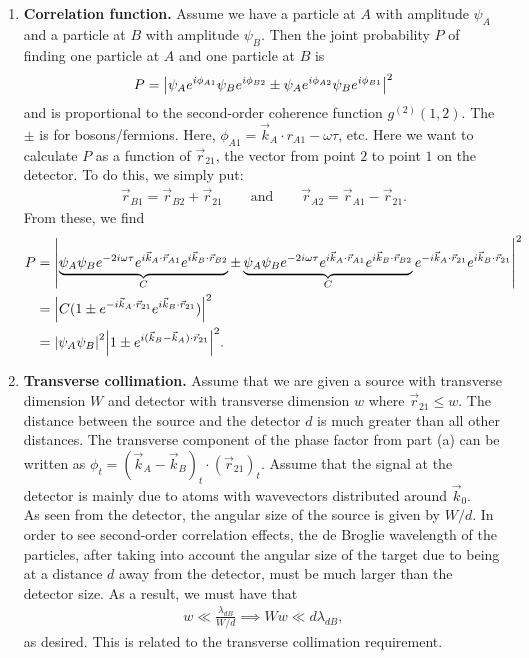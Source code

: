 \documentclass{article}
\theoremstyle{definition}
\newcommand{\f}[2]{\frac{#1}{#2}}
\begin{document}
\begin{enumerate}[label=(\alph*)]

\item \textbf{Correlation function.} Assume we have a particle at $A$ with amplitude $\psi_A$ and a particle at $B$ with amplitude $\psi_B$. Then the joint probability $P$ of finding one particle at $A$ and one particle at $B$ is 
\begin{align*}
P = \abs{\psi_A e^{i\phi_{A1}}   \psi_B  e^{i\phi_{B2}} \pm \psi_A e^{i\phi_{A2}} \psi_B e^{i\phi_{B1}} }^2
\end{align*}
and is proportional to the second-order coherence function $g^{(2)}(1,2)$. The $\pm$ is for bosons/fermions. Here, $\phi_{A1} = \vec{k}_A \cdot r_{A1}  -\omega \tau$, etc. Here we want to calculate $P$ as a function of $\vec{r}_{21}$, the vector from point $2$ to point $1$ on the detector. To do this, we simply put:
\begin{align*}
\vec{r}_{B1} =  \vec{r}_{B2} + \vec{r}_{21} \quad\quad \text{and} \quad\quad \vec{r}_{A2} = \vec{r}_{A1} - \vec{r}_{21}. 
\end{align*}
From these, we find 
\begin{align*}
P 
&= \abs{  \underbrace{ \psi_A \psi_B e^{-2i\omega \tau} e^{i\vec{k}_A \cdot \vec{r}_{A1}}  e^{i\vec{k}_B \cdot \vec{r}_{B2}} }_{C}
\pm
\underbrace{\psi_A \psi_B e^{-2i\omega\tau} e^{i\vec{k}_A \cdot \vec{r}_{A1} } e^{i\vec{k}_B\cdot \vec{r}_{B2}}}_{C}
e^{-i\vec{k}_A \cdot \vec{r}_{21}} e^{i\vec{k}_B \cdot \vec{r}_{21} } 
}^2 \\
&= \abs{C(1 \pm e^{-i\vec{k}_A \cdot \vec{r}_{21}} e^{i\vec{k}_B \cdot \vec{r}_{21} }  )}^2 \\ 
&= \abs{\psi_A \psi_B}^2 \abs{1 \pm e^{i(\vec{k}_B - \vec{k}_A ) \cdot \vec{r}_{21}   }}^2.
\end{align*}

\item \textbf{Transverse collimation.} Assume that we are given a source with transverse dimension $W$ and detector with transverse dimension $w$ where $\vec{r}_{21} \leq w$. The distance between the source and the detector $d$ is much greater than all other distances. The transverse component of the phase factor from part (a) can be written as $\phi_t = (\vec{k}_A - \vec{k}_B)_t \cdot (\vec{r}_{21})_t$. Assume that the signal at
the detector is mainly due to atoms with wavevectors distributed around $\vec{k}_0$. \\

\noindent  As seen from the detector, the angular size of the source is given by $W/d$. In order to see second-order correlation effects, the de Broglie wavelength of the particles, after taking into account the angular size of the target due to being at a distance $d$ away from the detector, must be much larger than the detector size.  As a result, we must have that 
\begin{align*}
w \ll \f{\lambda_{dB}}{W/d} \implies Ww \ll d \lambda_{dB},
\end{align*}
as desired. This is related to the transverse collimation requirement. \\



\end{enumerate}
\end{document}
